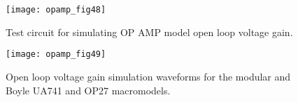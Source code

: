 \begin{figure} 
  \centering
  \texttt{[image: opamp\_fig48]}
  \caption{Test circuit for simulating OP AMP model open loop voltage gain. }  
  \label{fig:opamp48}
\end{figure}

\begin{figure} 
  \centering
  \texttt{[image: opamp\_fig49]}
  \caption{ Open loop voltage gain simulation waveforms for the modular and Boyle UA741 and OP27 macromodels. }  
  \label{fig:opamp49}
\end{figure}



